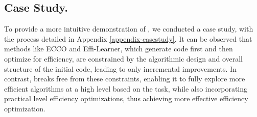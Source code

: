 \subsection{Case Study.}
To provide a more intuitive demonstration of \tool, we conducted a case study, with the process detailed in Appendix \ref{appendix-casestudy}. It can be observed that methods like ECCO and Effi-Learner, which generate code first and then optimize for efficiency, are constrained by the algorithmic design and overall structure of the initial code, leading to only incremental improvements. In contrast, \tool breaks free from these constraints, enabling it to fully explore more efficient algorithms at a high level based on the task, while also incorporating practical level efficiency optimizations, thus achieving more effective efficiency optimization.